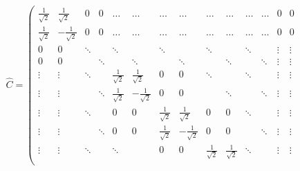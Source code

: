 \begin{center}
  \[ \hat{C} =
    \left(
    \begin{array}{cc|cc|cc|cc|cc|cc|cc}
        \frac{1}{\sqrt{2}} & \frac{1}{\sqrt{2}}  & 0      & 0      & \dots              & \dots               & \dots              & \dots               & \dots              & \dots               & \dots  & \dots  & 0                  & 0                   \\
        \frac{1}{\sqrt{2}} & -\frac{1}{\sqrt{2}} & 0      & 0      & \dots              & \dots               & \dots              & \dots               & \dots              & \dots               & \dots  & \dots  & 0                  & 0                   \\ \hline
        0                  & 0                   & \ddots &        & \ddots             &                     & \ddots             &                     & \ddots             &                     & \ddots &        & \vdots             & \vdots              \\
        0                  & 0                   &        & \ddots &                    & \ddots              &                    & \ddots              &                    & \ddots              &        & \ddots & \vdots             & \vdots              \\ \hline
        \vdots             & \vdots              & \ddots &        & \frac{1}{\sqrt{2}} & \frac{1}{\sqrt{2}}  & 0                  & 0                   & \ddots             &                     & \ddots &        & \vdots             & \vdots              \\
        \vdots             & \vdots              &        & \ddots & \frac{1}{\sqrt{2}} & -\frac{1}{\sqrt{2}} & 0                  & 0                   &                    & \ddots              &        & \ddots & \vdots             & \vdots              \\ \hline
        \vdots             & \vdots              & \ddots &        & 0                  & 0                   & \frac{1}{\sqrt{2}} & \frac{1}{\sqrt{2}}  & 0                  & 0                   & \ddots &        & \vdots             & \vdots              \\
        \vdots             & \vdots              &        & \ddots & 0                  & 0                   & \frac{1}{\sqrt{2}} & -\frac{1}{\sqrt{2}} & 0                  & 0                   &        & \ddots & \vdots             & \vdots              \\ \hline
        \vdots             & \vdots              & \ddots &        & \ddots             &                     & 0                  & 0                   & \frac{1}{\sqrt{2}} & \frac{1}{\sqrt{2}}  & \ddots &        & \vdots             & \vdots              \\

\end{array}\]
\end{center}
